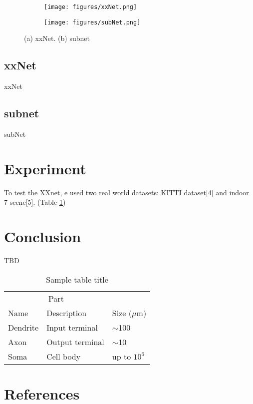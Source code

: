 \documentclass{article}
\begin{document}
\begin{figure}
  \centering
  \begin{subfigure}[b]{0.4\linewidth}
    \texttt{[image: figures/xxNet.png]}
    \caption{}
  \end{subfigure}
  \begin{subfigure}[b]{0.28\linewidth}
    \texttt{[image: figures/subNet.png]}
    \caption{}
  \end{subfigure}
  \caption{(a) xxNet. (b) subnet}
  \label{xxNet}
\end{figure}


\subsection{xxNet}
xxNet

\subsection{subnet}
subNet

\section{Experiment}
To test the XXnet, e used two real world datasets: KITTI dataset[4] and indoor 7-scene[5]. (Table \ref{results})

\section{Conclusion}
\label{headings}

TBD

\begin{table}
  \caption{Sample table title}
  \label{results}
  \centering
  \begin{tabular}{lll}
    \toprule
    \multicolumn{2}{c}{Part}                   \\
    \cmidrule(r){1-2}
    Name     & Description     & Size ($\mu$m) \\
    \midrule
    Dendrite & Input terminal  & $\sim$100     \\
    Axon     & Output terminal & $\sim$10      \\
    Soma     & Cell body       & up to $10^6$  \\
    \bottomrule
  \end{tabular}
\end{table}

\section*{References}
\end{document}
